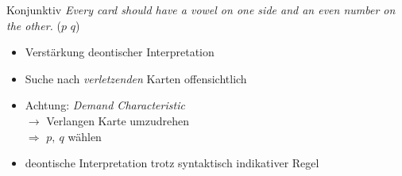 \begin{frame}{Konjunktiv {\scriptsize \cite[S.~99]{stenningHumanReasoningCognitive2008}}}
    \emph{Every card \alert{should} have a vowel on one side and an even number on the other.}
    ($p$ \raisebox{-0.25em}{$\stackrel{\to}{\sim}$} $q$)

    \begin{itemize}
        \item Verstärkung deontischer Interpretation
        \item Suche nach \emph{verletzenden} Karten offensichtlich
        \item Achtung: \emph{Demand Characteristic} \\
            $\to$ Verlangen Karte umzudrehen \\
            $\Rightarrow$ $p,~q$ wählen
        \item deontische Interpretation trotz syntaktisch indikativer Regel
    \end{itemize}
\end{frame}

